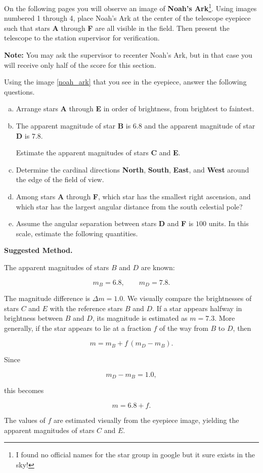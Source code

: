 \documentclass[a4paper,12pt]{extarticle}
\begin{document}
{ \footnotesize
On the following pages you will observe an image of \textbf{Noah's Ark}\footnote{I found no official names for the star group in google but it sure exists in the sky!}. Using images numbered 1 through 4, place Noah's Ark at the center of the telescope eyepiece such that stars \textbf{A} through \textbf{F} are all visible in the field. Then present the telescope to the station supervisor for verification.\\ 

\begin{pro}
	\textbf{Note:} You may ask the supervisor to recenter Noah's Ark, but in that case you will receive only half of the score for this section.
\end{pro}
\vspace{0.3cm}
Using the image \ref{noah_ark} that you see in the eyepiece, answer the following questions.

\begin{enumerate}[a.]
	\itemsep0em
	\item Arrange stars \textbf{A} through \textbf{E} in order of brightness, from brightest to faintest.
	\item The apparent magnitude of star \textbf{B} is \(6.8\) and the apparent magnitude of star \textbf{D} is \(7.8\).
	
	Estimate the apparent magnitudes of stars \textbf{C} and \textbf{E}.

	\item Determine the cardinal directions \textbf{North}, \textbf{South}, \textbf{East}, and \textbf{West} around the edge of the field of view.
	\item Among stars \textbf{A} through \textbf{F}, which star has the smallest right ascension, and which star has the largest angular distance from the south celestial pole?
	\item Assume the angular separation between stars \textbf{D} and \textbf{F} is \(100\) units. In this scale, estimate the following quantities.
\end{enumerate}}
\begin{sol}
	\footnotesize
	\textbf{Suggested Method.}
	
	The apparent magnitudes of stars \(B\) and \(D\) are known:
	
	\[
	m_B = 6.8,
	\qquad
	m_D = 7.8.
	\]
	
	The magnitude difference is $\Delta m = 1.0.$ We visually compare the brightnesses of stars \(C\) and \(E\) with the reference stars \(B\) and \(D\). If a star appears halfway in brightness between \(B\) and \(D\), its magnitude is estimated as $	m = 7.3.$ More generally, if the star appears to lie at a fraction \(f\) of the way from \(B\) to \(D\), then
	
	\[
	m
	=
	m_B
	+
	f\,(m_D-m_B).
	\]
	
	Since
	
	\[
	m_D-m_B=1.0,
	\]
	
	this becomes
	
	\[
	m
	=
	6.8+f.
	\]
	
	The values of \(f\) are estimated visually from the eyepiece image, yielding the apparent magnitudes of stars \(C\) and \(E\).
\end{sol}
\end{document}
